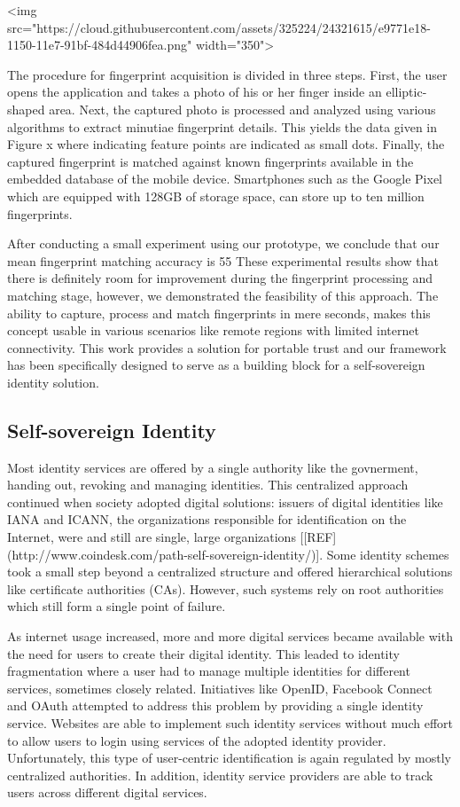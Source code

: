\documentclass[USenglish]{article}
\begin{document}
<img src="https://cloud.githubusercontent.com/assets/325224/24321615/e9771e18-1150-11e7-91bf-484d44906fea.png" width="350">

The procedure for fingerprint acquisition is divided in three steps.
First, the user opens the application and takes a photo of his or her finger inside an elliptic-shaped area.
Next, the captured photo is processed and analyzed using various algorithms to extract minutiae fingerprint details.
This yields the data given in Figure x where indicating feature points are indicated as small dots.
Finally, the captured fingerprint is matched against known fingerprints available in the embedded database of the mobile device.
Smartphones such as the Google Pixel which are equipped with 128GB of storage space, can store up to ten million fingerprints.

After conducting a small experiment using our prototype, we conclude that our mean fingerprint matching accuracy is 55%
These experimental results show that there is definitely room for improvement during the fingerprint processing and matching stage, however, we demonstrated the feasibility of this approach.
The ability to capture, process and match fingerprints in mere seconds, makes this concept usable in various scenarios like remote regions with limited internet connectivity.
This work provides a solution for portable trust and our framework has been specifically designed to serve as a building block for a self-sovereign identity solution.

\subsection{Self-sovereign Identity}

Most identity services are offered by a single authority like the govnerment, handing out, revoking and managing identities.
This centralized approach continued when society adopted digital solutions: issuers of digital identities like IANA and ICANN, the organizations responsible for identification on the Internet, were and still are single, large organizations [[REF](http://www.coindesk.com/path-self-sovereign-identity/)].
Some identity schemes took a small step beyond a centralized structure and offered hierarchical solutions like certificate authorities (CAs).
However, such systems rely on root authorities which still form a single point of failure.

As internet usage increased, more and more digital services became available with the need for users to create their digital identity.
This leaded to identity  fragmentation where a user had to manage multiple identities for different services, sometimes closely related.
Initiatives like OpenID, Facebook Connect and OAuth attempted to address this problem by providing a single identity service.
Websites are able to implement such identity services without much effort to allow users to login using services of the adopted identity provider.
Unfortunately, this type of user-centric identification is again regulated by mostly centralized authorities.
In addition, identity service providers are able to track users across different digital services.
\end{document}
